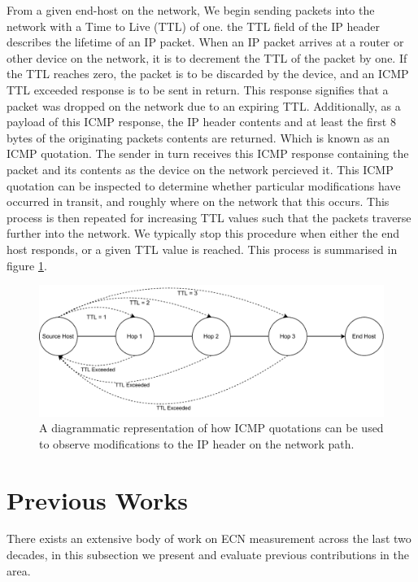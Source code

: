 \documentclass{l4proj}
\begin{document}
From a given end-host on the network, We begin sending packets into the network with a Time to Live (TTL) of one. the TTL field of the IP header describes the lifetime of an IP packet. When an IP packet arrives at a router or other device on the network, it is to decrement the TTL of the packet by one. If the TTL reaches zero, the packet is to be discarded by the device, and an ICMP TTL exceeded response is to be sent in return. This response signifies that a packet was dropped on the network due to an expiring TTL.
Additionally, as a payload of this ICMP response, the IP header contents and at least the first 8 bytes of the originating packets contents are returned. Which is known as an ICMP quotation. The sender in turn receives this ICMP response containing the packet and its contents as the device on the network percieved it. This ICMP quotation can be inspected to determine whether particular modifications have occurred in transit, and roughly where on the network that this occurs. This process is then repeated for increasing TTL values such that the packets traverse further into the network. We typically stop this procedure when either the end host responds, or a given TTL value is reached. This process is summarised in figure \ref{fig:icmp}.

\begin{figure}[H]

\centering
\includegraphics[width=14cm,keepaspectratio]{dissertation/images/icmp.pdf}
\caption{A diagrammatic representation of how ICMP quotations can be used to observe modifications to the IP header on the network path.}
\label{fig:icmp}
\end{figure}

\section{Previous Works}

There exists an extensive body of work on ECN measurement across the last two decades, in this subsection we present and evaluate previous contributions in the area.
\end{document}
